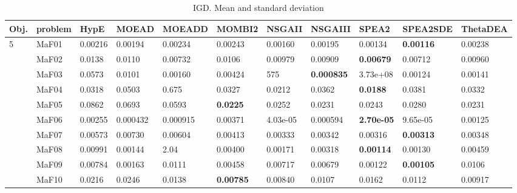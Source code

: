 \documentclass[]{article}
\begin{document}
\begin{landscape}
\begin{table}
\caption{IGD. Mean and standard deviation}
\label{table:mean.IGD}
\centering
\begin{footnotesize}
\begin{tabular}{|l|l|l|l|l|l|l|l|l|l|l|}
\hline
Obj. & problem  & HypE & MOEAD & MOEADD & MOMBI2 & NSGAII & NSGAIII & SPEA2 & SPEA2SDE & ThetaDEA \\ \hline

\multirow{15}{*}{5} & MaF01 & 0.00216 & 0.00194 & 0.00234 & 0.00243 & \cellcolor{gray95} 0.00160 & 0.00195 & \cellcolor{gray95} 0.00134 & \cellcolor{gray95} {\bf 0.00116} & 0.00238\\
 & MaF02 & 0.0138 & 0.0110 & \cellcolor{gray95} 0.00732 & 0.0106 & 0.00979 & 0.00909 & \cellcolor{gray95} {\bf 0.00679} & \cellcolor{gray95} 0.00712 & 0.00960\\
 & MaF03 & 0.0573 & 0.0101 & 0.00160 & 0.00424 & 575 & \cellcolor{gray95} {\bf 0.000835} & 3.73e+08 & \cellcolor{gray95} 0.00124 & \cellcolor{gray95} 0.00141\\
 & MaF04 & 0.0318 & 0.0503 & 0.675 & 0.0327 & \cellcolor{gray95} 0.0212 & 0.0362 & \cellcolor{gray95} {\bf 0.0188} & 0.0381 & 0.0332\\
 & MaF05 & 0.0862 & 0.0693 & 0.0593 & \cellcolor{gray95} {\bf 0.0225} & 0.0252 & \cellcolor{gray95} 0.0231 & \cellcolor{gray95} 0.0243 & 0.0280 & \cellcolor{gray95} 0.0231\\
 & MaF06 & 0.00255 & 0.000432 & 0.000915 & 0.00371 & \cellcolor{gray95} 4.03e-05 & 0.000594 & \cellcolor{gray95} {\bf 2.70e-05} & \cellcolor{gray95} 9.65e-05 & 0.00125\\
 & MaF07 & 0.00573 & 0.00730 & 0.00604 & 0.00413 & \cellcolor{gray95} 0.00333 & \cellcolor{gray95} 0.00342 & \cellcolor{gray95} 0.00316 & \cellcolor{gray95} {\bf 0.00313} & \cellcolor{gray95} 0.00348\\
 & MaF08 & 0.00991 & \cellcolor{gray95} 0.00144 & 2.04 & 0.00400 & 0.00171 & 0.00318 & \cellcolor{gray95} {\bf 0.00114} & \cellcolor{gray95} 0.00130 & 0.00459\\
 & MaF09 & 0.00784 & \cellcolor{gray95} 0.00163 & 0.0111 & 0.00458 & 0.00717 & 0.00679 & \cellcolor{gray95} 0.00122 & \cellcolor{gray95} {\bf 0.00105} & 0.0106\\
 & MaF10 & 0.0216 & 0.0246 & 0.0138 & \cellcolor{gray95} {\bf 0.00785} & \cellcolor{gray95} 0.00840 & \cellcolor{gray95} 0.0107 & 0.0162 & 0.0112 & \cellcolor{gray95} 0.00917\\

\end{tabular}
\end{footnotesize}
\end{table}
\end{landscape}
\end{document}

